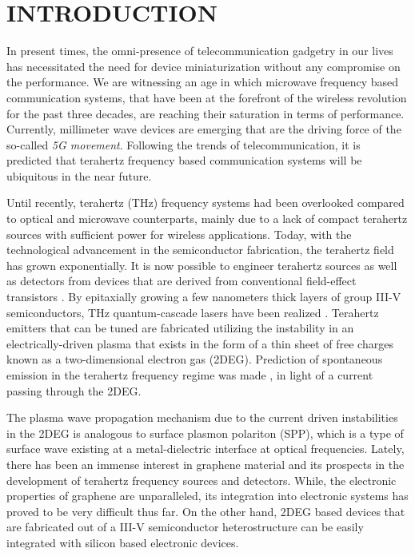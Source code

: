 \pagestyle{plain} %
\setcounter{page}{1}


\chapter{\uppercase {Introduction}}

In present times, the omni-presence of telecommunication gadgetry in our lives has necessitated the need for device miniaturization without any compromise on the performance. We are witnessing an age in which microwave frequency based communication systems, that have been at the forefront of the wireless revolution for the past three decades, are reaching their saturation in terms of performance. Currently, millimeter wave devices are emerging that are the driving force of the so-called \emph{5G movement}. Following the trends of telecommunication, it is predicted that terahertz frequency based communication systems will be ubiquitous in the near future.

Until recently, terahertz (THz) frequency systems had been overlooked compared to optical and microwave counterparts, mainly due to a lack of compact terahertz sources with sufficient power for wireless applications. Today, with the technological advancement in the semiconductor fabrication, the terahertz field has grown exponentially. It is now possible to engineer terahertz sources as well as detectors from devices that are derived from conventional field-effect transistors \cite{Kempa1991,Dyakonov1993,Dyakonov2001}. By epitaxially growing a few nanometers thick layers of group III-V semiconductors, THz quantum-cascade lasers have been realized \cite{Williams2003}. Terahertz emitters that can be tuned are fabricated utilizing the instability in an electrically-driven plasma \cite{Krasheninnikov1980} that exists in the form of a thin sheet of free charges known as a two-dimensional electron gas (2DEG). Prediction of spontaneous emission in the terahertz frequency regime was made
\cite{Kempa1991}, in light of a current passing through the 2DEG.

The plasma wave propagation mechanism due to the current driven instabilities in the 2DEG is analogous to surface plasmon polariton (SPP), which is a type of surface wave existing at a metal-dielectric interface at optical frequencies. Lately, there has been an immense interest in graphene material and its prospects in the development of terahertz frequency sources and detectors. While, the electronic properties of graphene are unparalleled, its integration into electronic systems has proved to be very difficult thus far. On the other hand, 2DEG based devices that are fabricated out of a III-V semiconductor heterostructure can be easily integrated with silicon based electronic devices.

